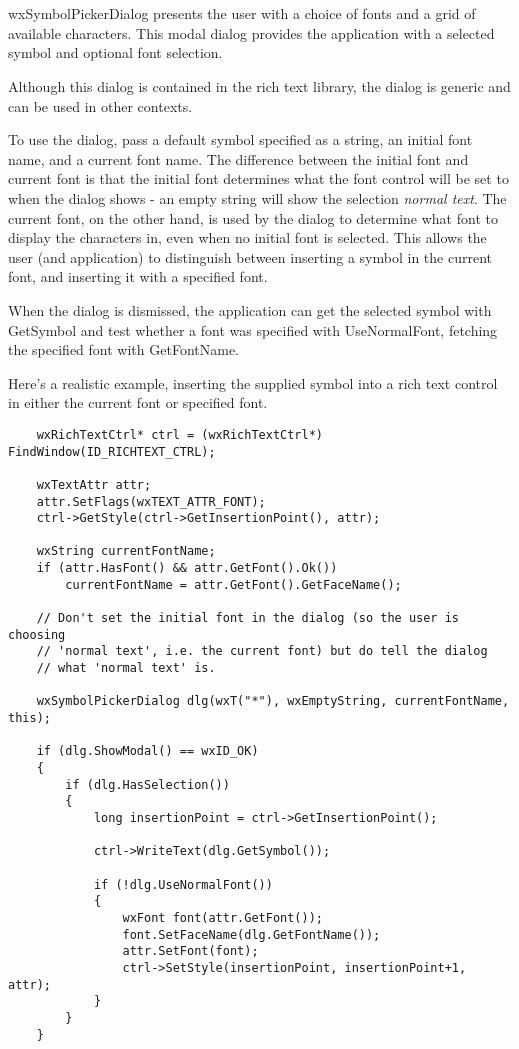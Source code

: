 \section{}\label{wxsymbolpickerdialog}

wxSymbolPickerDialog presents the user with a choice of fonts and a grid
of available characters. This modal dialog provides the application with
a selected symbol and optional font selection.

Although this dialog is contained in the rich text library, the dialog
is generic and can be used in other contexts.

To use the dialog, pass a default symbol specified as a string, an initial font name,
and a current font name. The difference between the initial font and
current font is that the initial font determines what the font control will be
set to when the dialog shows - an empty string will show the selection {\it normal text}.
The current font, on the other hand, is used by the dialog to determine what font
to display the characters in, even when no initial font is selected.
This allows the user (and application) to distinguish between inserting a
symbol in the current font, and inserting it with a specified font.

When the dialog is dismissed, the application can get the selected symbol
with GetSymbol and test whether a font was specified with UseNormalFont,
fetching the specified font with GetFontName.

Here's a realistic example, inserting the supplied symbol into a
rich text control in either the current font or specified font.

\begin{verbatim}
    wxRichTextCtrl* ctrl = (wxRichTextCtrl*) FindWindow(ID_RICHTEXT_CTRL);

    wxTextAttr attr;
    attr.SetFlags(wxTEXT_ATTR_FONT);
    ctrl->GetStyle(ctrl->GetInsertionPoint(), attr);

    wxString currentFontName;
    if (attr.HasFont() && attr.GetFont().Ok())
        currentFontName = attr.GetFont().GetFaceName();

    // Don't set the initial font in the dialog (so the user is choosing
    // 'normal text', i.e. the current font) but do tell the dialog
    // what 'normal text' is.

    wxSymbolPickerDialog dlg(wxT("*"), wxEmptyString, currentFontName, this);

    if (dlg.ShowModal() == wxID_OK)
    {
        if (dlg.HasSelection())
        {
            long insertionPoint = ctrl->GetInsertionPoint();

            ctrl->WriteText(dlg.GetSymbol());

            if (!dlg.UseNormalFont())
            {
                wxFont font(attr.GetFont());
                font.SetFaceName(dlg.GetFontName());
                attr.SetFont(font);
                ctrl->SetStyle(insertionPoint, insertionPoint+1, attr);
            }
        }
    }
\end{verbatim}

